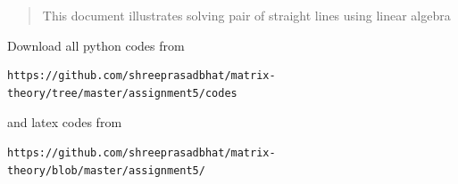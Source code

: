 \documentclass[journal,12pt,twocolumn]{IEEEtran}
\begin{document}
% 
\maketitle
\newpage
\bigskip
\renewcommand{\thefigure}{\theenumi}
\renewcommand{\thetable}{\theenumi}
%
%
\begin{abstract}
This document illustrates solving pair of straight lines using linear algebra
\end{abstract}
Download all python codes from 
%
\begin{lstlisting}
https://github.com/shreeprasadbhat/matrix-theory/tree/master/assignment5/codes
\end{lstlisting}
%
and latex codes from 
%
\begin{lstlisting}
https://github.com/shreeprasadbhat/matrix-theory/blob/master/assignment5/
\end{lstlisting}
%
\end{document}
